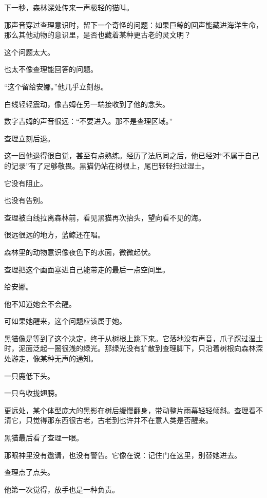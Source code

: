 下一秒，森林深处传来一声极轻的猫叫。

那声音穿过查理意识时，留下一个奇怪的问题：如果巨鲸的回声能藏进海洋生命，那么其他动物的意识里，是否也藏着某种更古老的灵文明？

这个问题太大。

也太不像查理能回答的问题。

“这个留给安娜。”他几乎立刻想。

白线轻轻震动，像吉姆在另一端接收到了他的念头。

数字吉姆的声音很远：“不要进入。那不是查理区域。”

查理立刻后退。

这一回他退得很自觉，甚至有点熟练。经历了法厄同之后，他已经对“不属于自己的记录”有了足够敬畏。黑猫仍站在树根上，尾巴轻轻扫过湿土。

它没有阻止。

也没有告别。

查理被白线拉离森林前，看见黑猫再次抬头，望向看不见的海。

很远很远的地方，蓝鲸还在唱。

森林里的动物意识像夜色下的水面，微微起伏。

查理把这个画面塞进自己能带走的最后一点空间里。

给安娜。

他不知道她会不会醒。

可如果她醒来，这个问题应该属于她。

黑猫像是等到了这个决定，终于从树根上跳下来。它落地没有声音，爪子踩过湿土时，泥面泛起一圈很浅的绿光。那绿光没有扩散到查理脚下，只沿着树根向森林深处游走，像某种无声的通知。

一只鹿低下头。

一只鸟收拢翅膀。

更远处，某个体型庞大的黑影在树后缓慢翻身，带动整片雨幕轻轻倾斜。查理看不清它，只觉得那东西很古老，古老到也许并不在意人类是否醒来。

黑猫最后看了查理一眼。

那眼神里没有邀请，也没有警告。它像在说：记住门在这里，别替她进去。

查理点了点头。

他第一次觉得，放手也是一种负责。
